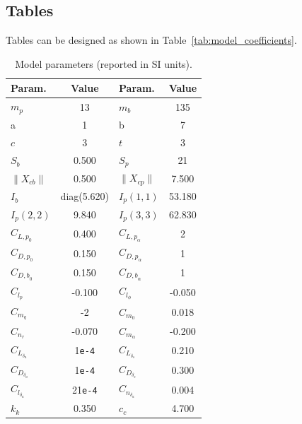 \documentclass[]{iac_class}
\begin{document}
\subsection{Tables}

Tables can be designed as shown in Table~\ref{tab:model_coefficients}.

\begin{table}[t]
\centering
\begin{tabular}{lc|lc}
\textbf{Param.} & \textbf{Value}       & \textbf{Param.} & \textbf{Value}         \\ \hline
$m_p$                & 13                   & $m_b$                & 135                    \\
a                    & 1                    & b                    & 7                      \\
$c$                  & 3                    & $t$                  & 3                      \\
$S_b$                & 0.500                  & $S_p$                & 21                     \\
$\|X_{cb}\|$         & 0.500                  & $\|X_{cp}\|$         & 7.500                    \\
$I_b$                & diag(5.620)           & $I_p(1,1)$          & 53.180 \\
$I_p(2,2)$          &  9.840                 & $I_p(3,3)$          & 62.830\\
$C_{{L,p}_0}$            & 0.400                  & $C_{{L,p}_\alpha}$            &  2                      \\
$C_{{D,p}_0}$            &  0.150                 & $C_{{D,p}_\alpha}$    & 1                       \\
$C_{{D,b}_0}$            &  0.150                 & $C_{{D,b}_\alpha}$    & 1                       \\
$C_{l_p}$            &  -0.100                & $C_{l_\phi}$       &   -0.050                     \\
$C_{m_q}$            & -2                   & $C_{m_0}$          &  0.018                    \\
$C_{n_r}$            & -0.070              & $C_{m_\alpha}$       & -0.200                \\
$C_{L_{\delta_a}}$   & 1\texttt{e-4}      & $C_{L_{\delta_s}}$   &  0.210                      \\
$C_{D_{\delta_a}}$   & 1\texttt{e-4}      & $C_{D_{\delta_s}}$   & 0.300                       \\
$C_{l_{\delta_a}}$ &  21\texttt{e-4}      & $C_{n_{\delta_a}}$   & 0.004\\
$k_k$                &   0.350                   & $c_c$          &  4.700       \\\hline
\end{tabular}
\caption{Model parameters (reported in SI units).}
\end{table}\label{tab:model_coefficients}
\end{document}
